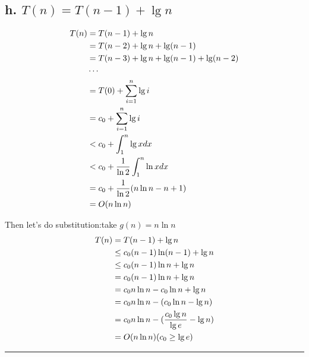 \documentclass[oneside]{homework} %
\begin{document}
\subsection*{h. $T(n)=T(n-1)+ \lg n $}
\begin{equation}
\notag
\begin{aligned}[b]
T(n) &= T(n-1) + \lg n \\
&= T(n-2) + \lg n + \lg (n-1)\\
&= T(n-3) + \lg n + \lg (n-1) + \lg (n-2)\\
& \cdots \\
&= T(0) + \sum_{i=1}^{n}\lg i \\
&= c_{0} + \sum_{i=1}^{n}\lg i \\
&< c_{0} + \int_{1}^{n} \lg x dx \\
&< c_{0} + \frac{1}{\ln 2}\int_{1}^{n} \ln x dx \\
&= c_{0} + \frac{1}{\ln 2}(n\ln n -n +1)\\
&= O(n\ln n)\\
\end{aligned}
\end{equation}

Then let's do substitution:take $g(n)= n\ln n$
\begin{equation}
\notag
\begin{aligned}[b]
T(n) &= T(n-1) + \lg n \\
&\leq c_{0}(n-1)\ln (n-1) + \lg n \\
&\leq c_{0}(n-1) \ln n +\lg n \\
&= c_{0}(n-1) \ln n +\lg n \\
&= c_{0}n \ln n -c_{0}\ln n + \lg n \\
&= c_{0}n \ln n -(c_{0}\ln n - \lg n) \\
&= c_{0}n \ln n -(\frac{c_{0}\lg n}{\lg e} - \lg n) \\
&= O(n\ln n) (c_{0} \geq \lg e )\\
\end{aligned}
\end{equation}
\rule{3mm}{3mm}
\end{document}
